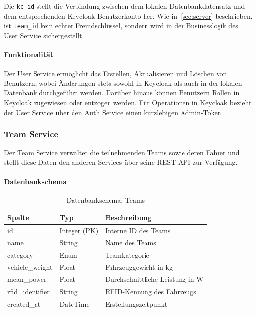 Die \texttt{kc\_id} stellt die Verbindung zwischen dem lokalen 
Datenbankdatensatz und dem entsprechenden Keycloak-Benutzerkonto 
her. Wie in~\ref{sec:server} beschrieben, ist \texttt{team\_id} kein echter Fremdschlüssel, 
sondern wird in der Businesslogik des User Service sichergestellt.

\paragraph{Funktionalität}
Der User Service ermöglicht das Erstellen, Aktualisieren und 
Löschen von Benutzern, wobei Änderungen stets sowohl in Keycloak 
als auch in der lokalen Datenbank durchgeführt werden. Darüber 
hinaus können Benutzern Rollen in Keycloak zugewiesen oder 
entzogen werden. Für Operationen in Keycloak bezieht der 
User Service über den Auth Service einen kurzlebigen Admin-Token.

\subsubsection{Team Service}
\label{sec:team_service}

Der Team Service verwaltet die teilnehmenden Teams sowie deren 
Fahrer und stellt diese Daten den anderen Services über seine 
REST-\gls{API} zur Verfügung.

\paragraph{Datenbankschema}
\begin{table}[h]
    \centering
    \begin{tabular}{|l|l|l|}
        \hline
        \textbf{Spalte} & \textbf{Typ} & \textbf{Beschreibung} \\
        \hline
        id & Integer (PK) & Interne ID des Teams \\
        name & String & Name des Teams \\
        category & Enum & Teamkategorie \\
        vehicle\_weight & Float & Fahrzeuggewicht in kg \\
        mean\_power & Float & Durchschnittliche Leistung in W \\
        rfid\_identifier & String & RFID-Kennung des Fahrzeugs \\
        created\_at & DateTime & Erstellungszeitpunkt \\
        \hline
    \end{tabular}
    \caption{Datenbankschema: Teams}
    \label{tab:team_schema}
\end{table}

